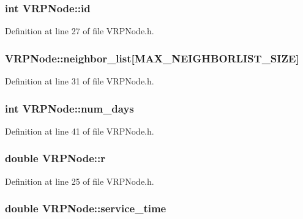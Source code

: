\hypertarget{class_v_r_p_node_a326a7068d690791bf8bc92587845efe8}{
\subsubsection[{id}]{\setlength{\rightskip}{0pt plus 5cm}int {\bf VRPNode::id}}}
\label{class_v_r_p_node_a326a7068d690791bf8bc92587845efe8}


Definition at line 27 of file VRPNode.h.

\hypertarget{class_v_r_p_node_a549274ca67660efc1ce57f88c2e81646}{
\subsubsection[{neighbor\_\-list}]{ {\bf VRPNode::neighbor\_\-list}\mbox{[}MAX\_\-NEIGHBORLIST\_\-SIZE\mbox{]}}}
\label{class_v_r_p_node_a549274ca67660efc1ce57f88c2e81646}


Definition at line 31 of file VRPNode.h.

\hypertarget{class_v_r_p_node_a7227a60538a6ce18325bc3ce9db0e70b}{
\subsubsection[{num\_\-days}]{\setlength{\rightskip}{0pt plus 5cm}int {\bf VRPNode::num\_\-days}}}
\label{class_v_r_p_node_a7227a60538a6ce18325bc3ce9db0e70b}


Definition at line 41 of file VRPNode.h.

\hypertarget{class_v_r_p_node_ac70ecfc9bd16dbc8814305eea16df1ed}{
\subsubsection[{r}]{\setlength{\rightskip}{0pt plus 5cm}double {\bf VRPNode::r}}}
\label{class_v_r_p_node_ac70ecfc9bd16dbc8814305eea16df1ed}


Definition at line 25 of file VRPNode.h.

\hypertarget{class_v_r_p_node_aec6d87eb84084a6392893af499212ec4}{
\subsubsection[{service\_\-time}]{\setlength{\rightskip}{0pt plus 5cm}double {\bf VRPNode::service\_\-time}}}
\label{class_v_r_p_node_aec6d87eb84084a6392893af499212ec4}


